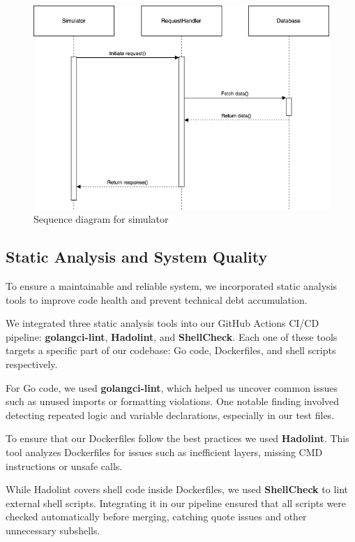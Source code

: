 \begin{figure}[H]
  \centering
  \includegraphics[width=\textwidth]{images/simulator.png}
  \caption{Sequence diagram for simulator}
  \label{fig:simulator-interaction}
\end{figure}


\subsection{Static Analysis and System Quality}
To ensure a maintainable and reliable system, we incorporated static analysis tools to improve code health and prevent technical debt accumulation.

We integrated three static analysis tools into our GitHub Actions CI/CD pipeline: \textbf{golangci-lint}, \textbf{Hadolint}, and \textbf{ShellCheck}. Each one of these tools targets a specific part of our codebase: Go code, Dockerfiles, and shell scripts respectively.


For Go code, we used \textbf{golangci-lint}, which helped us uncover common issues such as unused imports or formatting violations. One notable finding involved detecting repeated logic and variable declarations, especially in our test files.

To ensure that our Dockerfiles follow the best practices we used \textbf{Hadolint}. This tool analyzes Dockerfiles for issues such as inefficient layers, missing CMD instructions or unsafe calls.


While Hadolint covers shell code inside Dockerfiles, we used \textbf{ShellCheck} to lint external shell scripts. Integrating it in our pipeline ensured that all scripts were checked automatically before merging, catching quote issues and other unnecessary subshells.

